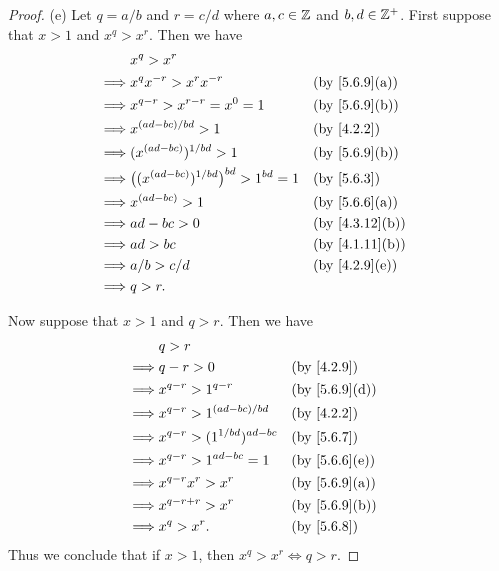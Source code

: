 \begin{proof}{(e)}
  Let \(q = a / b\) and \(r = c / d\) where \(a, c \in \mathbb{Z}\) and \(b, d \in \mathbb{Z}^+\).
  First suppose that \(x > 1\) and \(x^q > x^r\).
  Then we have
  \begin{align*}
             & x^q > x^r                                                                              \\
    \implies & x^q x^{-r} > x^r x^{-r}                              &  & \text{(by \cref{5.6.9}(a))}  \\
    \implies & x^{q - r} > x^{r - r} = x^0 = 1                      &  & \text{(by \cref{5.6.9}(b))}  \\
    \implies & x^{(ad - bc) / bd} > 1                               &  & \text{(by \cref{4.2.2})}     \\
    \implies & (x^{(ad - bc)})^{1 / bd} > 1                         &  & \text{(by \cref{5.6.9}(b))}  \\
    \implies & \big((x^{(ad - bc)})^{1 / bd}\big)^{bd} > 1^{bd} = 1 &  & \text{(by \cref{5.6.3})}     \\
    \implies & x^{(ad - bc)} > 1                                    &  & \text{(by \cref{5.6.6}(a))}  \\
    \implies & ad - bc > 0                                          &  & \text{(by \cref{4.3.12}(b))} \\
    \implies & ad > bc                                              &  & \text{(by \cref{4.1.11}(b))} \\
    \implies & a / b > c / d                                        &  & \text{(by \cref{4.2.9}(e))}  \\
    \implies & q > r.
  \end{align*}

  Now suppose that \(x > 1\) and \(q > r\).
  Then we have
  \begin{align*}
             & q > r                                                               \\
    \implies & q - r > 0                          &  & \text{(by \cref{4.2.9})}    \\
    \implies & x^{q - r} > 1^{q - r}              &  & \text{(by \cref{5.6.9}(d))} \\
    \implies & x^{q - r} > 1^{(ad - bc) / bd}     &  & \text{(by \cref{4.2.2})}    \\
    \implies & x^{q - r} > (1^{1 / bd})^{ad - bc} &  & \text{(by \cref{5.6.7})}    \\
    \implies & x^{q - r} > 1^{ad - bc} = 1        &  & \text{(by \cref{5.6.6}(e))} \\
    \implies & x^{q - r} x^r > x^r                &  & \text{(by \cref{5.6.9}(a))} \\
    \implies & x^{q - r + r} > x^r                &  & \text{(by \cref{5.6.9}(b))} \\
    \implies & x^q > x^r.                         &  & \text{(by \cref{5.6.8})}
  \end{align*}
  Thus we conclude that if \(x > 1\), then \(x^q > x^r \iff q > r\).


\end{proof}
